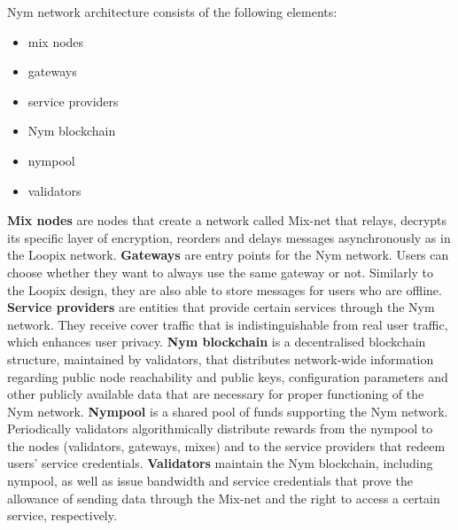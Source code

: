 Nym network architecture consists of the following elements:
\begin{itemize}
    \item mix nodes
    \item gateways
    \item service providers
    \item Nym blockchain
    \item nympool
    \item validators
\end{itemize}

\textbf{Mix nodes} are nodes that create a network called Mix-net that relays, decrypts its specific layer of encryption, reorders and delays messages asynchronously as in the Loopix network. \textbf{Gateways} are entry points for the Nym network. Users can choose whether they want to always use the same gateway or not. Similarly to the Loopix design, they are also able to store messages for users who are offline. \textbf{Service providers} are entities that provide certain services through the Nym network. They receive cover traffic that is indistinguishable from real user traffic, which enhances user privacy. \textbf{Nym blockchain} is a decentralised blockchain structure, maintained by validators, that distributes network-wide information regarding public node reachability and public keys, configuration parameters and other publicly available data that are necessary for proper functioning of the Nym network. \textbf{Nympool} is a shared pool of funds supporting the Nym network. Periodically validators algorithmically distribute rewards from the nympool to the nodes (validators, gateways, mixes) and to the service providers that redeem users’ service credentials. \textbf{Validators} maintain the Nym blockchain, including nympool, as well as issue bandwidth and service credentials that prove the allowance of sending data through the Mix-net and the right to access a certain service, respectively.

